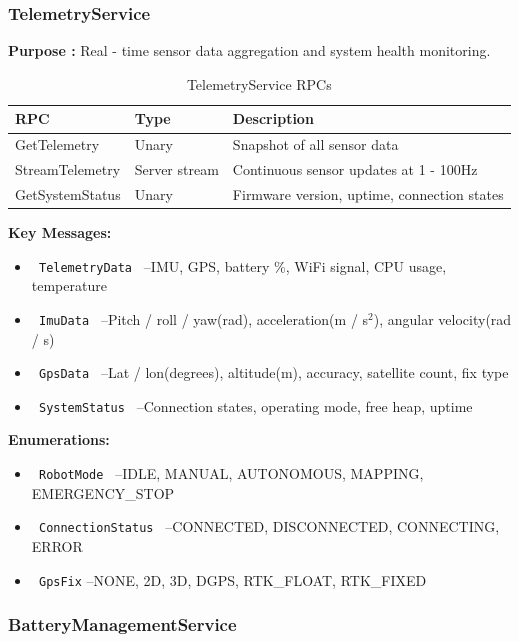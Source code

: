 \subsubsection{TelemetryService}

\textbf{Purpose :} Real -
    time sensor data aggregation and system health monitoring.

\begin{table}[H]
\centering
\caption{TelemetryService RPCs}
\label{tab:telemetry-rpcs}
\begin{tabular} { | l | l | p{6cm} |}
\hline
\textbf{RPC} & \textbf{Type} & \textbf{Description}
\\
\hline GetTelemetry &Unary &Snapshot of all sensor
        data \\
StreamTelemetry &Server stream &Continuous sensor updates at 1 -
    100Hz \\
GetSystemStatus &Unary &Firmware version,
    uptime, connection states \\
\hline
\end{tabular}
\end{table}

\textbf{Key Messages:}
\begin{itemize}[leftmargin = 1.5em, topsep = 4pt, itemsep = 2pt]
    \item \texttt {
  TelemetryData
}
--IMU, GPS, battery \%, WiFi signal, CPU usage, temperature
    \item \texttt {
  ImuData
}
--Pitch / roll / yaw(rad), acceleration(m / s$ ^ 2 $), angular velocity(rad / s)
    \item \texttt {
  GpsData
}
--Lat / lon(degrees), altitude(m), accuracy, satellite count, fix type
    \item \texttt {
  SystemStatus
}
--Connection states, operating mode, free heap, uptime
\end{itemize}

\textbf{Enumerations:
}
\begin{itemize}[leftmargin = 1.5em, topsep = 4pt, itemsep = 2pt]
    \item \texttt {
  RobotMode
}
--IDLE, MANUAL, AUTONOMOUS, MAPPING, EMERGENCY\_STOP
    \item \texttt {
  ConnectionStatus
}
--CONNECTED, DISCONNECTED, CONNECTING, ERROR
    \item \texttt { GpsFix}
--NONE, 2D, 3D, DGPS, RTK\_FLOAT, RTK\_FIXED
\end{itemize}

\subsubsection{BatteryManagementService}

